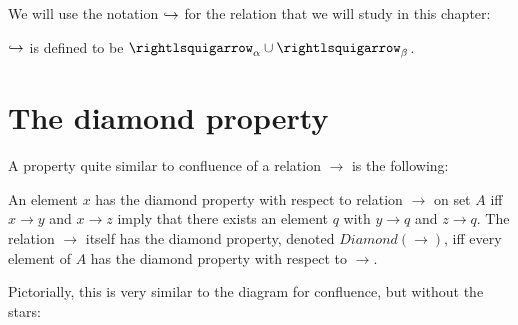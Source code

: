 We will use the notation $\hookrightarrow$ for the relation that we
will study in this chapter:

\begin{definition}
  \label{def:abeta}
  $\hookrightarrow$ is defined to be $\curva_\alpha \cup \curva_\beta$.
  \end{definition}

\section{The diamond property}

A property quite similar to confluence of a relation $\to$ is
the following:
\begin{definition}
\label{def:diamond}
  An element $x$ has the diamond property with respect to relation
  $\to$ on set $A$ iff $x \to y$ and $x \to z$ imply that there exists an element $q$
  with $y \to q$ and $z \to q$. The relation $\to$ itself has the diamond
  property, denoted $\textit{Diamond}(\to)$, iff every element of $A$ has
  the diamond property with respect to $\to$.  
  \end{definition}
\noindent Pictorially, this is very similar to the diagram for confluence,
but without the stars:

\begin{center}
\end{center}

